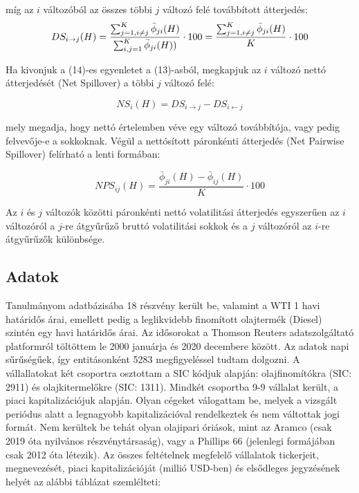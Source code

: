 \documentclass[12pt,bibliography=totoc]{article}
\begin{document}
míg az $i$ változóból az összes többi $j$ változó felé továbbított átterjedés:
\begin{equation}
DS_{i\rightarrow{}j}(H)=\frac{\sum_{j=1,i\neq{}j}^{K}\bar{\phi}_{ji}(H)} {\sum_{i,j=1}^{K}\bar{\phi}_{ji}(H))} \cdot 100= \frac{\sum_{j=1,i\neq{}j}^{K}\bar{\phi}_{ji}(H)} {K} \cdot 100 \\
\end{equation}

Ha kivonjuk a (14)-es egyenletet a (13)-asból, megkapjuk az $i$ változó nettó átterjedését (Net Spillover) a többi $j$ változó felé:

\begin{equation}
NS_{i}(H)=DS_{i\rightarrow{}j} - DS_{i\leftarrow{}j}
\end{equation}

mely megadja, hogy nettó értelemben véve egy változó továbbítója, vagy pedig felvevője-e a sokkoknak. Végül a nettósított páronkénti átterjedés (Net Pairwise Spillover) felírható a lenti formában:

\begin{equation}
NPS_{ij}(H)=\frac{\bar{\phi}_{ji}(H)-\bar{\phi}_{ij}(H)} {K} \cdot 100
\end{equation}

Az $i$ és $j$ változók közötti páronkénti nettó volatilitási átterjedés egyszerűen az $i$ változóról a $j$-re átgyűrűző bruttó volatilitási sokkok és a $j$ változóról az $i$-re átgyűrűzők különbsége.

\subsection{Adatok}

Tanulmányom adatbázisába 18 részvény került be, valamint a WTI 1 havi határidős árai, emellett pedig a leglikvidebb finomított olajtermék (Diesel) szintén egy havi határidős árai. Az idősorokat a Thomson Reuters adatszolgáltató platformról töltöttem le 2000 januárja és 2020 decembere között. Az adatok napi sűrűségűek, így entitásonként 5283 megfigyeléssel tudtam dolgozni. A vállallatokat két csoportra osztottam a SIC kódjuk alapján: olajfinomítókra (SIC: 2911) és olajkitermelőkre (SIC: 1311). Mindkét csoportba 9-9 vállalat került, a piaci kapitalizációjuk alapján. Olyan cégeket válogattam be, melyek a vizsgált periódus alatt a legnagyobb kapitalizációval rendelkeztek és nem váltottak jogi formát. Nem kerültek be tehát olyan olajipari óriások, mint az Aramco (csak 2019 óta nyilvános részvénytársaság), vagy a Phillips 66 (jelenlegi formájában csak 2012 óta létezik). Az összes feltételnek megfelelő vállalatok tickerjeit, megnevezését, piaci kapitalizációját (millió USD-ben) és elsődleges jegyzésének helyét az alábbi táblázat szemlélteti:
\end{document}

